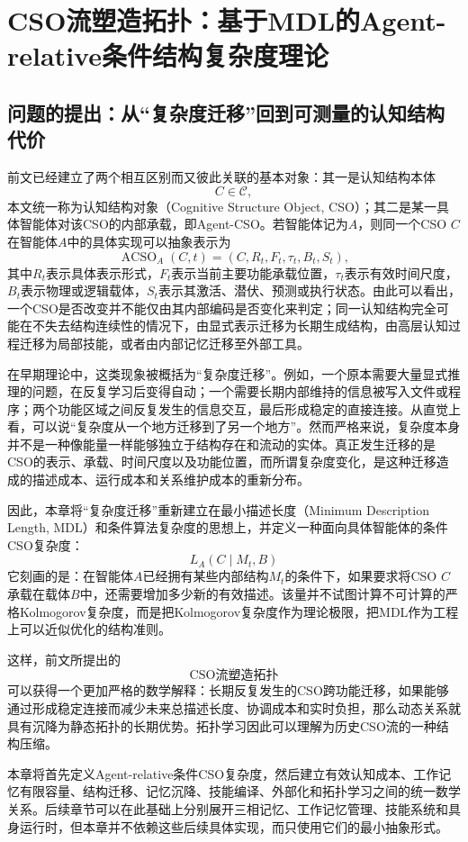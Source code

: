 \chapter{CSO流塑造拓扑：基于MDL的Agent-relative条件结构复杂度理论}
\label{chap:cso-mdl-topology}

\section{问题的提出：从“复杂度迁移”回到可测量的认知结构代价}

前文已经建立了两个相互区别而又彼此关联的基本对象：其一是认知结构本体
\[
C\in\mathcal{C},
\]
本文统一称为认知结构对象（Cognitive Structure Object, CSO）；其二是某一具体智能体对该CSO的内部承载，即Agent-CSO。若智能体记为$A$，则同一个CSO $C$在智能体$A$中的具体实现可以抽象表示为
\[
\operatorname{ACSO}_{A}(C,t)
=
\left(
C,
R_t,
F_t,
\tau_t,
B_t,
S_t
\right),
\]
其中$R_t$表示具体表示形式，$F_t$表示当前主要功能承载位置，$\tau_t$表示有效时间尺度，$B_t$表示物理或逻辑载体，$S_t$表示其激活、潜伏、预测或执行状态。由此可以看出，一个CSO是否改变并不能仅由其内部编码是否变化来判定；同一认知结构完全可能在不失去结构连续性的情况下，由显式表示迁移为长期生成结构，由高层认知过程迁移为局部技能，或者由内部记忆迁移至外部工具。

在早期理论中，这类现象被概括为“复杂度迁移”。例如，一个原本需要大量显式推理的问题，在反复学习后变得自动；一个需要长期内部维持的信息被写入文件或程序；两个功能区域之间反复发生的信息交互，最后形成稳定的直接连接。从直觉上看，可以说“复杂度从一个地方迁移到了另一个地方”。然而严格来说，复杂度本身并不是一种像能量一样能够独立于结构存在和流动的实体。真正发生迁移的是CSO的表示、承载、时间尺度以及功能位置，而所谓复杂度变化，是这种迁移造成的描述成本、运行成本和关系维护成本的重新分布。

因此，本章将“复杂度迁移”重新建立在最小描述长度（Minimum Description Length, MDL）和条件算法复杂度的思想上，并定义一种面向具体智能体的条件CSO复杂度：
\[
\boxed{
L_A(C\mid M_t,B)
}
\]
它刻画的是：在智能体$A$已经拥有某些内部结构$M_t$的条件下，如果要求将CSO $C$承载在载体$B$中，还需要增加多少新的有效描述。该量并不试图计算不可计算的严格Kolmogorov复杂度，而是把Kolmogorov复杂度作为理论极限，把MDL作为工程上可以近似优化的结构准则。

这样，前文所提出的
\[
\text{CSO流塑造拓扑}
\]
可以获得一个更加严格的数学解释：长期反复发生的CSO跨功能迁移，如果能够通过形成稳定连接而减少未来总描述长度、协调成本和实时负担，那么动态关系就具有沉降为静态拓扑的长期优势。拓扑学习因此可以理解为历史CSO流的一种结构压缩。

本章将首先定义Agent-relative条件CSO复杂度，然后建立有效认知成本、工作记忆有限容量、结构迁移、记忆沉降、技能编译、外部化和拓扑学习之间的统一数学关系。后续章节可以在此基础上分别展开三相记忆、工作记忆管理、技能系统和具身运行时，但本章并不依赖这些后续具体实现，而只使用它们的最小抽象形式。

